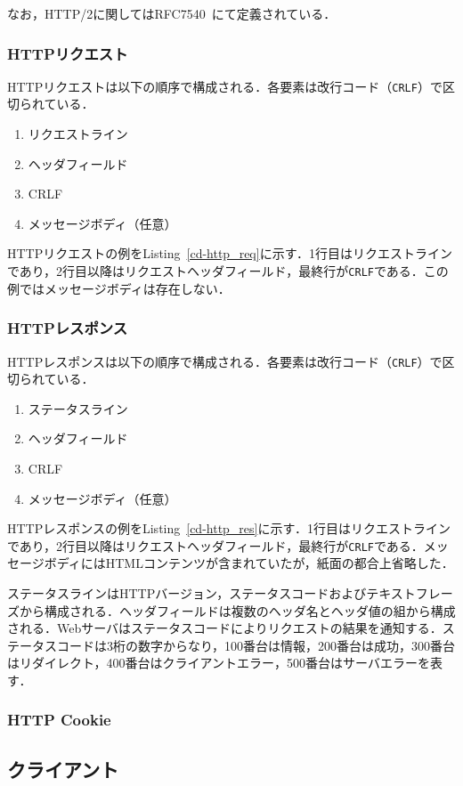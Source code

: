 なお，HTTP/2に関してはRFC7540~\cite{rfc7540}にて定義されている．
\subsubsection{HTTPリクエスト}
HTTPリクエストは以下の順序で構成される．各要素は改行コード（\texttt{CRLF}）で区切られている．
\begin{enumerate}
\item リクエストライン
\item ヘッダフィールド
\item CRLF
\item メッセージボディ（任意）
\end{enumerate}
HTTPリクエストの例をListing~\ref{cd-http_req}に示す．1行目はリクエストラインであり，2行目以降はリクエストヘッダフィールド，最終行が\texttt{CRLF}である．この例ではメッセージボディは存在しない．

\subsubsection{HTTPレスポンス}
HTTPレスポンスは以下の順序で構成される．各要素は改行コード（\texttt{CRLF}）で区切られている．
\begin{enumerate}
\item ステータスライン
\item ヘッダフィールド
\item CRLF
\item メッセージボディ（任意）
\end{enumerate}
HTTPレスポンスの例をListing~\ref{cd-http_res}に示す．1行目はリクエストラインであり，2行目以降はリクエストヘッダフィールド，最終行が\texttt{CRLF}である．メッセージボディにはHTMLコンテンツが含まれていたが，紙面の都合上省略した．

ステータスラインはHTTPバージョン，ステータスコードおよびテキストフレーズから構成される．ヘッダフィールドは複数のヘッダ名とヘッダ値の組から構成される．Webサーバはステータスコードによりリクエストの結果を通知する．ステータスコードは3桁の数字からなり，100番台は情報，200番台は成功，300番台はリダイレクト，400番台はクライアントエラー，500番台はサーバエラーを表す．
\subsubsection{HTTP Cookie}
\subsection{クライアント}
